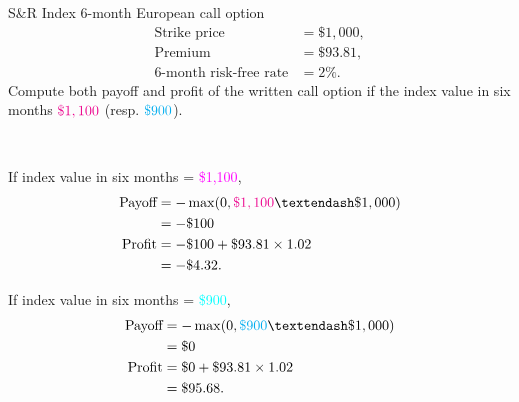 \begin{frame}[fragile,t]
	\begin{myexample}
		 S\&R Index 6-month European call option
		 \begin{align*}
			 \text{Strike price}           & = \$1,000, \\
			 \text{Premium}                & = \$93.81, \\
			 \text{6-month risk-free rate} & = 2\%.
		 \end{align*}
		 Compute both payoff and profit of the \textcolor{alert}{written} call option if the index
		 value in six months $\textcolor{magenta}{\$1,100}$ (resp.  $\textcolor{cyan}{\$900}$).
	\end{myexample}
	\bigskip
	\pause
	\begin{mysol}\phantom{a}\\[1em]

	 \begin{minipage}{0.48\textwidth}
		\begin{center}
			If index value in six months = \textcolor{magenta}{\$1,100},
			\begin{align*}
				\text{Payoff} & = - \max ( 0, \textcolor{magenta}{\$1,100} – \$1,000 ) \\
                      & = - \$100                                              \\
				\text{Profit} & = - \$100 + \$93.81 \times 1.02                        \\
                      & = - \$4.32.
			\end{align*}
		\end{center}
	 \end{minipage}
	 \hfill \pause
	 \begin{minipage}{0.48\textwidth}
		\begin{center}
			If index value in six months = \textcolor{cyan}{\$900},
			\begin{align*}
				\text{Payoff} & = - \max ( 0, \textcolor{cyan}{\$900} – \$1,000 ) \\
                      & = \$0                                             \\
				\text{Profit} & = \$0 + \$93.81 \times 1.02                       \\
                      & = \$95.68.
			\end{align*}
		\end{center}
	 \end{minipage}

	 \myEnd
	\end{mysol}
\end{frame}
